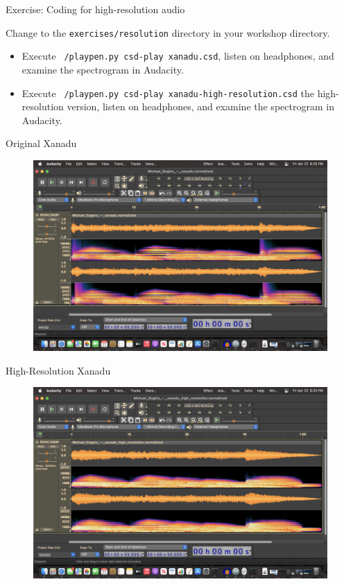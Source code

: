 \documentclass{beamer}
\begin{document}
\begin{frame}{Exercise: Coding for high-resolution audio}
\begin{example}
Change to the \texttt{exercises/resolution} directory in your workshop directory.
\begin{itemize}
\item Execute \texttt{~/playpen.py csd-play xanadu.csd}, listen on headphones, and examine the spectrogram in Audacity.
\item Execute \texttt{~/playpen.py csd-play xanadu-high-resolution.csd} the high-resolution version, listen on headphones, and examine the spectrogram in Audacity.
\end{itemize}
\end{example}
\end{frame}

\begin{frame}{Original Xanadu}
\begin{figure}
\centerline{\includegraphics[height = 0.66\textwidth]{xanadu}}
\end{figure}
\end{frame}

\begin{frame}{High-Resolution Xanadu}
\begin{figure}
\centerline{\includegraphics[height = 0.66\textwidth]{xanadu-high-resolution}}
\end{figure}
\end{frame}
\end{document}
